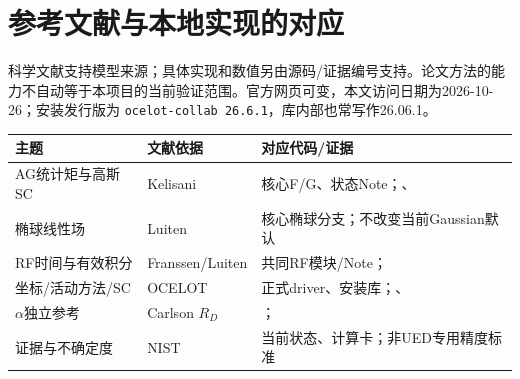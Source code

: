 \section{参考文献与本地实现的对应}\label{app:references}
科学文献支持模型来源；具体实现和数值另由源码/证据编号支持。论文方法的能力不自动等于本项目的当前验证范围。官方网页可变，本文访问日期为2026-10-26；安装发行版为 \texttt{ocelot-collab 26.6.1}，库内部也常写作26.06.1。

\noindent\begin{tabularx}{\linewidth}{P{28mm}YY}\toprule
主题 & 文献依据 & 对应代码/证据 \\ \midrule
AG统计矩与高斯SC & Kelisani\cite{kelisani} & 核心F/G、状态Note；、 \\
椭球线性场 & Luiten\cite{luiten} & 核心椭球分支；不改变当前Gaussian默认 \\
RF时间与有效积分 & Franssen/Luiten\cite{franssen} & 共同RF模块/Note； \\
坐标/活动方法/SC & OCELOT\cite{occoord,ocelements,ocsc} & 正式driver、安装库；、 \\
$\alpha$独立参考 & Carlson $R_D$\cite{scipyrd} & ； \\
证据与不确定度 & NIST\cite{nist} & 当前状态、计算卡；非UED专用精度标准 \\
\bottomrule\end{tabularx}



